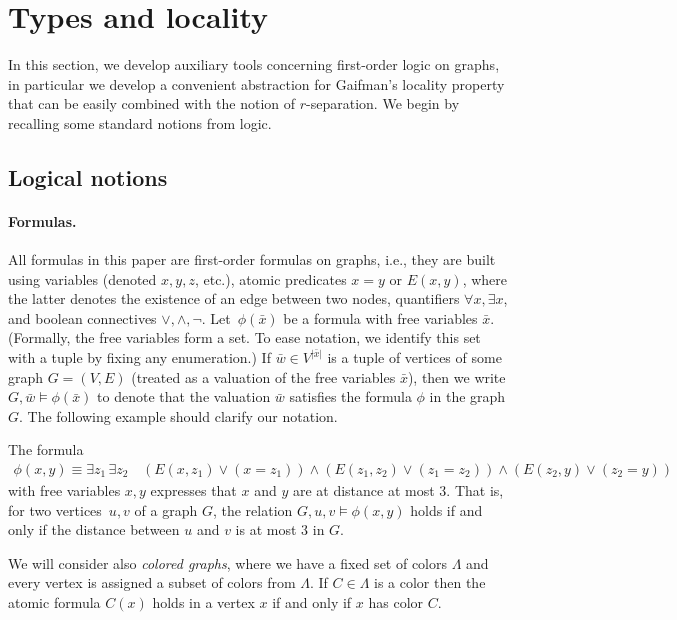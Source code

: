 \section{Types and locality}\label{sec:gaifman}
In this section, we develop auxiliary tools concerning first-order logic on graphs, 
in particular we develop a convenient abstraction for Gaifman's locality property that can be easily combined with the notion of $r$-separation.
We begin by recalling some standard notions from logic.

\subsection{Logical notions}

\paragraph{Formulas.}
All formulas in this paper are first-order formulas on graphs,
i.e., they are built using variables (denoted $x,y,z$, etc.),
atomic predicates $x=y$ or $E(x,y)$,
where the latter denotes the existence of an edge between two nodes, quantifiers $\forall x,\exists x$, and boolean connectives $\lor,\land,\neg$. 
Let~$\phi(\bar x)$ be a formula with free variables 
$\bar x$. (Formally, the free variables form a set.
To ease notation, we identify this set with a tuple by fixing any 
enumeration.)
If $\bar w\in V^{|\bar x|}$ is a tuple of vertices of some graph $G=(V,E)$ (treated as a valuation of the free variables $\bar x$), then we write $G,\bar w\models \phi(\bar x)$
to denote that the valuation $\bar w$ satisfies the formula $\phi$ in the graph $G$.
The following example should clarify our notation.

\begin{example}\label{ex:dist-formula}
The formula
\begin{align*}
\phi(x,y)\equiv \exists z_1\, \exists z_2\, & (E(x,z_1)\lor (x=z_1))\land (E(z_1,z_2) 
 \lor (z_1=z_2))\land (E(z_2,y)\lor (z_2=y))
\end{align*}
with free variables $x,y$ expresses that $x$ and $y$ are at distance at most $3$.
That is, for two vertices~$u,v$ of a graph $G$,
the relation $G,u,v\models \phi(x,y)$ holds 
if and only if the distance between $u$ and $v$ is at most $3$ in $G$.
\end{example}

We will consider also \emph{colored graphs},
where we have a fixed set of colors $\Lambda$ and every vertex is assigned a subset of colors from 
$\Lambda$. If $C\in \Lambda$ is a color then the atomic formula $C(x)$ holds in a vertex $x$ if and only if $x$ has color $C$.

